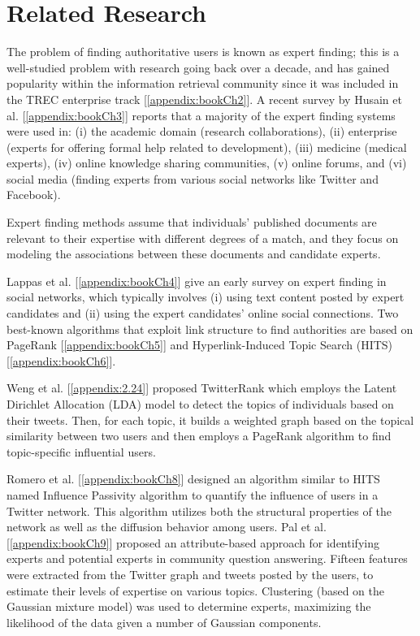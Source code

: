 \section{Related Research} \label{sec2}

The problem of finding authoritative users is known as expert finding; this is a well-studied problem with research going back over a decade, and has gained popularity within the information retrieval community since it was included in the TREC enterprise track [\ref{appendix:bookCh2}]. A recent survey by Husain et al. [\ref{appendix:bookCh3}] reports that a majority of the expert finding systems were used in: (i) the academic domain (research collaborations), (ii) enterprise (experts for offering formal help related to development), (iii) medicine (medical experts), (iv) online knowledge sharing communities, (v) online forums, and (vi) social media (finding experts from various social networks like Twitter and Facebook).

Expert finding methods assume that individuals' published documents are relevant to their expertise with different degrees of a match, and they focus on modeling the associations between these documents and candidate experts.

Lappas et al. [\ref{appendix:bookCh4}] give an early survey on expert finding in social networks, which typically involves (i) using text content posted by expert candidates and (ii) using the expert candidates' online social connections. Two best-known algorithms that exploit link structure to find authorities are based on PageRank [\ref{appendix:bookCh5}] and  Hyperlink-Induced Topic Search (HITS) [\ref{appendix:bookCh6}]. 

Weng et al. [\ref{appendix:2.24}] proposed TwitterRank which employs the Latent Dirichlet Allocation (LDA) model to detect the topics of individuals based on their tweets. Then, for each topic, it builds a weighted graph based on the topical similarity between two users %
and then employs a PageRank algorithm to find topic-specific influential users. 

Romero et al. [\ref{appendix:bookCh8}] designed an algorithm similar to HITS named Influence Passivity algorithm to quantify the influence of users in a Twitter network. This algorithm utilizes both the structural properties of the network as well as the diffusion behavior among users. Pal et al. [\ref{appendix:bookCh9}] proposed an attribute-based approach for identifying experts and potential experts in community question answering. Fifteen features were extracted from the Twitter graph and tweets posted by the users, to estimate their levels of expertise on various topics. 
Clustering (based on the Gaussian mixture model) was used to determine experts,  maximizing the likelihood of the data given a number of Gaussian components.


